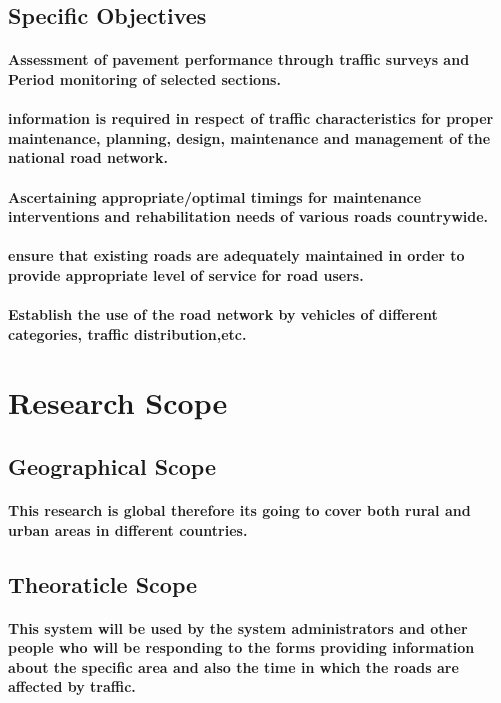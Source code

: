 \documentclass{article}
\begin{document}
\subsection{Specific Objectives}
\paragraph{Assessment of pavement performance through traffic surveys and Period monitoring of selected sections.}
\paragraph{information is required in respect of traffic characteristics for proper maintenance, planning, design, maintenance and management of the national road network.}
\paragraph{Ascertaining appropriate/optimal timings for maintenance interventions and rehabilitation needs of various roads countrywide.}
\paragraph{ensure that existing roads are adequately maintained in order to provide appropriate level of service for road users.
}
\paragraph{Establish the use of the road network by vehicles of different categories, traffic distribution,etc.}
\section{Research Scope}
\subsection{Geographical Scope}
\paragraph{This research  is global therefore its going to cover both rural and urban areas in different countries.}
\subsection{Theoraticle Scope}
\paragraph{This system will be used by the system administrators and other people who will be responding to the forms providing information about the specific area and also the time in which the roads are affected by traffic.}
\end{document}
